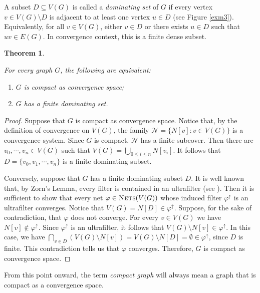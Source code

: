 \documentclass{amsart}
\newtheorem{theorem}{Theorem}[section]
\theoremstyle{definition}
\theoremstyle{remark}
\numberwithin{equation}{section}
\begin{document}
A subset $D \subseteq V(G)$ is called a \emph{dominating set} of $G$ if every vertex $v \in V(G) \setminus D$ is adjacent to at least one vertex $u \in D$ (see Figure \ref{exm3}). Equivalently, for all $v \in V(G)$, either $v \in D$ or there exists $u \in D$ such that $uv \in E(G)$. In convergence context, this is a finite dense subset.

\begin{theorem}
	\label{teocomp2}
	
		For every graph $G$, the following are equivalent:
	\begin{enumerate}
		\item $G$ is compact as convergence space;
		\item  $G$ has a finite dominating set.
	\end{enumerate}


\end{theorem}




\begin{proof}
	Suppose that $G$ is compact as convergence space. Notice that, by the definition of convergence on $V(G)$, the family $\mathcal{N}=\{N[v]:v\in V(G)\}$ is a convergence system. Since $G$ is compact, $\mathcal{N}$ has a finite subcover. Then there are $v_0,\cdots,v_n\in V(G)$ such that $V(G)=\bigcup_{0\leq i\leq n} N[v_i]$. It follows that $D=\{v_0,v_1,\cdots,v_n\}$ is a finite dominating subset.
	
	Conversely, suppose that $G$ has a finite dominating subset $D$. 
	It is well known that, by Zorn's Lemma, every filter is contained in an ultrafilter 
	(see \cite[Lemma 7.5]{Jech}). Then it is sufficient to show that every net $\varphi\in\textsc{Nets}(V(G))$  whose induced filter $\varphi^\uparrow$ is an ultrafilter converges. Notice that $V(G)=N[D]\in\varphi^\uparrow$. Suppose, for the sake of contradiction, that $\varphi$ does not converge. For every $v\in V(G)$ we have $N[v]\notin \varphi^\uparrow$. Since $\varphi^\uparrow$ is an ultrafilter, it follows that $V(G)\setminus N[v]\in \varphi^\uparrow$.  In this case, we have $ \bigcap_{v\in D} (V(G)\setminus N[v])=V(G)\setminus N[D]=\emptyset\in\varphi^\uparrow$, since $D$ is finite. This contradiction tells us that $\varphi$ converges. Therefore, $G$ is compact as convergence space.
\end{proof}

From this point onward, the term \emph{compact graph} will always mean a graph that is compact as a convergence space.
\end{document}
